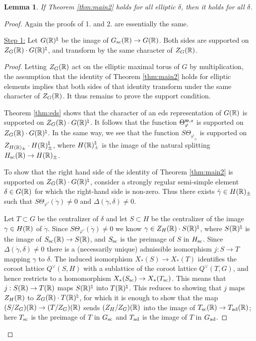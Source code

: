 \documentclass{article}
\newtheorem{lem}[thm]{Lemma}
\theoremstyle{definition}
\numberwithin{equation}{section}
\renewcommand{\-}{\hyp{}}
\begin{document}
\begin{lem} \label{lem:redell}
If Theorem \ref{thm:main2} holds for all elliptic $\delta$, then it holds for all $\delta$.
\end{lem}
\begin{proof}

  Again the proofs of 1. and 2. are essentially the same.

  \underline{Step 1:} Let $G(\mathbb{R})^\natural$ be the image of $G_{\textrm{sc}}(\mathbb{R}) \to G(\mathbb{R})$. Both sides are supported on $Z_G(\mathbb{R}) \cdot G(\mathbb{R})^\natural$, and transform by the same character of $Z_G(\mathbb{R})$. 

  \begin{proof}
	Letting $Z_G(\mathbb{R})$ act on the elliptic maximal torus of $G$ by multiplication, the assumption that the identity of Theorem \ref{thm:main2} holds for elliptic elements implies that both sides of that identity transform under the same character of $Z_G(\mathbb{R})$. It thus remains to prove the support condition.	
	
	Theorem \ref{thm:eds} shows that the character of an eds representation of $G(\mathbb{R})$ is supported on $Z_G(\mathbb{R}) \cdot G(\mathbb{R})^\natural$. It follows that the function $\Theta_\varphi^{\mathfrak{w},s}$ is supported on $Z_G(\mathbb{R}) \cdot G(\mathbb{R})^\natural$. In the same way, we see that the function $S\Theta_{\varphi_\pm}$ is supported on $Z_{H(\mathbb{R})_\pm} \cdot H(\mathbb{R})_\pm^\natural$, where $H(\mathbb{R})_\pm^\natural$ is the image of the natural splitting $H_{\textrm{sc}}(\mathbb{R}) \to H(\mathbb{R})_\pm$.
	
	

	To show that the right hand side of the identity of Theorem \ref{thm:main2} is supported on $Z_G(\mathbb{R}) \cdot G(\mathbb{R})^\natural$, consider a strongly regular semi-simple element $\delta \in G(\mathbb{R})$ for which the right-hand side is non-zero. Thus there exists $\dot\gamma \in H(\mathbb{R})_\pm$ such that $S\Theta_{\varphi'}(\dot\gamma) \neq 0$ and $\Delta(\dot\gamma,\delta)\neq 0$. 
	
	Let $T \subset G$ be the centralizer of $\delta$ and let $S \subset H$ be the centralizer of the image $\gamma \in H(\mathbb{R})$ of $\dot\gamma$. Since $S\Theta_{\varphi'}(\dot\gamma) \neq 0$ we know $\gamma \in Z_H(\mathbb{R}) \cdot S(\mathbb{R})^\natural$, where $S(\mathbb{R})^\natural$ is the image of $S_{\textrm{sc}}(\mathbb{R}) \to S(\mathbb{R})$, and $S_{\textrm{sc}}$ is the preimage of $S$ in $H_{\textrm{sc}}$. Since $\Delta(\dot\gamma,\delta)\neq 0$ there is a (necessarily unique) admissible isomorphism $j : S \to T$ mapping $\gamma$ to $\delta$. The induced isomorphism $X_*(S) \to X_*(T)$ identifies the coroot lattice $Q^\vee(S,H)$ with a sublattice of the coroot lattice $Q^\vee(T,G)$, and hence restricts to a homomorphism $X_*(S_{\textrm{sc}}) \to X_*(T_{\textrm{sc}})$. This means that $j : S(\mathbb{R}) \to T(\mathbb{R})$ maps $S(\mathbb{R})^\natural$ into $T(\mathbb{R})^\natural$. This reduces to showing that $j$ maps $Z_H(\mathbb{R})$ to $Z_G(\mathbb{R}) \cdot T(\mathbb{R})^\natural$, for which it is enough to show that the map $(S/Z_G)(\mathbb{R}) \to (T/Z_G)(\mathbb{R})$ sends $(Z_H/Z_G)(\mathbb{R})$ into the image of $T_{\textrm{sc}}(\mathbb{R}) \to T_{\textrm{ad}}(\mathbb{R})$; here $T_{\textrm{sc}}$ is the preimage of $T$ in $G_{\textrm{sc}}$ and $T_{\textrm{ad}}$ is the image of $T$ in $G_{\textrm{ad}}$. 
	

\end{proof}
\end{proof}
\end{document}
